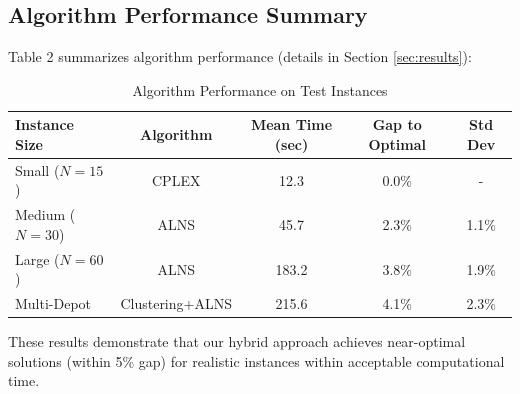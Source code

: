 \subsection{Algorithm Performance Summary}

Table 2 summarizes algorithm performance (details in Section \ref{sec:results}):

\begin{table}[H]
\centering
\caption{Algorithm Performance on Test Instances}
\begin{tabular}{lcccc}
\toprule
Instance Size & Algorithm & Mean Time (sec) & Gap to Optimal & Std Dev \\
\midrule
Small ($N=15$) & CPLEX & 12.3 & 0.0\% & - \\
Medium ($N=30$) & ALNS & 45.7 & 2.3\% & 1.1\% \\
Large ($N=60$) & ALNS & 183.2 & 3.8\% & 1.9\% \\
Multi-Depot & Clustering+ALNS & 215.6 & 4.1\% & 2.3\% \\
\bottomrule
\end{tabular}
\end{table}

These results demonstrate that our hybrid approach achieves near-optimal solutions (within 5\% gap) for realistic instances within acceptable computational time.
